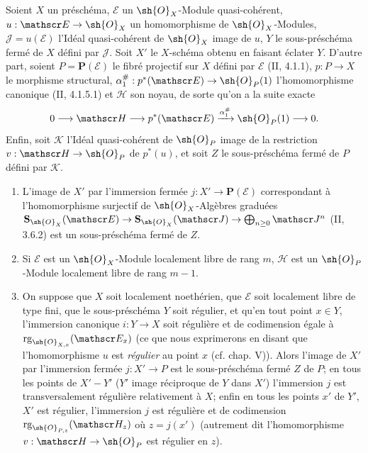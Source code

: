\begin{proposition}[19.4.11]
Soient $X$ un préschéma, $\mathscr E$ un $\sh{O}_X$-Module quasi-cohérent, $u:\mathscr E\to\sh{O}_X$ un homomorphisme de $\sh{O}_X$-Modules, $\mathscr J=u(\mathscr E)$ l'Idéal quasi-cohérent de $\sh{O}_X$ image de $u$, $Y$ le sous-préschéma fermé de $X$ défini par $\mathscr J$. Soit $X'$ le $X$-schéma obtenu en faisant éclater $Y$. D'autre part, soient $P=\mathbf P(\mathscr E)$ le fibré projectif sur $X$ défini par $\mathscr E$ (II, 4.1.1), $p:P\to X$ le morphisme structural, $\alpha_1^{\#}:p^*(\mathscr E)\to\sh{O}_P(1)$ l'homomorphisme canonique (II, 4.1.5.1) et $\mathscr H$ son noyau, de sorte qu'on a la suite exacte
\[
  0\longrightarrow\mathscr H\longrightarrow p^*(\mathscr E)\xrightarrow{\alpha_1^{\#}}\sh{O}_P(1)\longrightarrow0.
\]
Enfin, soit $\mathscr K$ l'Idéal quasi-cohérent de $\sh{O}_P$ image de la restriction $v:\mathscr H\to\sh{O}_P$ de $p^*(u)$, et soit $Z$ le sous-préschéma fermé de $P$ défini par $\mathscr K$.


\begin{enumerate}
  \item[(i)] L'image de $X'$ par l'immersion fermée $j:X'\to\mathbf P(\mathscr E)$ correspondant à l'homomorphisme surjectif de $\sh{O}_X$-Algèbres graduées $\mathbf S_{\sh{O}_X}(\mathscr E)\to\mathbf S_{\sh{O}_X}(\mathscr J)\to\bigoplus_{n\geq0}\mathscr J^n$ (II, 3.6.2) est un sous-préschéma fermé de $Z$.
  \item[(ii)] Si $\mathscr E$ est un $\sh{O}_X$-Module localement libre de rang $m$, $\mathscr H$ est un $\sh{O}_P$-Module localement libre de rang $m-1$.
  \item[(iii)] On suppose que $X$ soit localement noethérien, que $\mathscr E$ soit localement libre de type fini, que le sous-préschéma $Y$ soit régulier, et qu'en tout point $x\in Y$, l'immersion canonique $i:Y\to X$ soit régulière et de codimension égale à $\operatorname{rg}_{\sh{O}_{X,x}}(\mathscr E_x)$ (ce que nous exprimerons en disant que l'homomorphisme $u$ est \emph{régulier} au point $x$ (cf. chap. V)). Alors l'image de $X'$ par l'immersion fermée $j:X'\to P$ est le sous-préschéma fermé $Z$ de $P$; en tous les points de $X'-Y'$ ($Y'$ image réciproque de $Y$ dans $X'$) l'immersion $j$ est transversalement régulière relativement à $X$; enfin en tous les points $x'$ de $Y'$, $X'$ est régulier, l'immersion $j$ est régulière et de codimension $\operatorname{rg}_{\sh{O}_{P,z}}(\mathscr H_z)$ où $z=j(x')$ (autrement dit l'homomorphisme $v:\mathscr H\to\sh{O}_P$ est régulier en $z$).
\end{enumerate}
\end{proposition}

